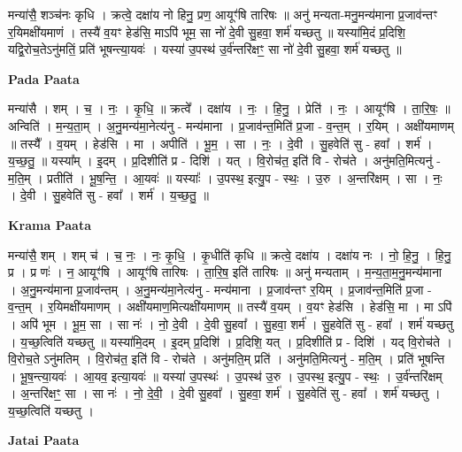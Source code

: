 \documentclass[17pt]{extarticle}
\begin{document}
मन्या॑सै॒ शञ्च॑नः कृधि । क्रत्वे॒ दक्षा॑य नो हिनु॒ प्रण॒ आयूꣳ॑षि तारिषः ॥ अनु॑ मन्यता-मनु॒मन्य॑माना प्र॒जाव॑न्तꣳ र॒यिमक्षी॑यमाणं । तस्यै॑ व॒यꣳ हेड॑सि॒ माऽपि॑ भूम॒ सा नो॑ दे॒वी सु॒हवा॒ शर्म॑ यच्छतु ॥ यस्या॑मि॒दं प्र॒दिशि॒ यद्वि॒रोच॒तेऽनु॑मतिं॒ प्रति॑ भूषन्त्या॒यवः॑ । यस्या॑ उ॒पस्थ॑ उ॒र्व॑न्तरि॑क्षꣳ॒॒ सा नो॑ दे॒वी सु॒हवा॒ शर्म॑ यच्छतु ॥ \newline

\textbf{Pada Paata} \newline

मन्या॑सै । शम् । च॒ । नः॒ । कृ॒धि॒ ॥ क्रत्वे᳚ । दक्षा॑य । नः॒ । हि॒नु॒ । प्रेति॑ । नः॒ । आयूꣳ॑षि । ता॒रि॒षः॒ ॥ अन्विति॑ । म॒न्य॒ता॒म् । अ॒नु॒मन्य॑मा॒नेत्य॑नु - मन्य॑माना । प्र॒जाव॑न्त॒मिति॑ प्र॒जा - व॒न्त॒म् । र॒यिम् । अक्षी॑यमाणम् ॥ तस्यै᳚ । व॒यम् । हेड॑सि । मा । अपीति॑ । भू॒म॒ । सा । नः॒ । दे॒वी । सु॒हवेति॑ सु - हवा᳚ । शर्म॑ । य॒च्छ॒तु॒ ॥ यस्या᳚म् । इ॒दम् । प्र॒दिशीति॑ प्र - दिशि॑ । यत् । वि॒रोच॑त॒ इति॑ वि - रोच॑ते । अनु॑मति॒मित्यनु॑ - म॒ति॒म् । प्रतीति॑ । भू॒ष॒न्ति॒ । आ॒यवः॑ ॥ यस्याः᳚ । उ॒पस्थ॒ इत्यु॒प - स्थः॒ । उ॒रु । अ॒न्तरि॑क्षम् । सा । नः॒ । दे॒वी । सु॒हवेति॑ सु - हवा᳚ । शर्म॑ । य॒च्छ॒तु॒ ॥  \newline


\textbf{Krama Paata} \newline

मन्या॑सै॒ शम् । शम् च॑ । च॒ नः॒ । नः॒ कृ॒धि॒ । कृ॒धीति॑ कृधि ॥ क्रत्वे॒ दक्षा॑य । दक्षा॑य नः । नो॒ हि॒नु॒ । हि॒नु॒ प्र । प्र णः॑ । न॒ आयूꣳ॑षि । आयूꣳ॑षि तारिषः । ता॒रि॒ष॒ इति॑ तारिषः ॥ अनु॑ मन्यताम् । म॒न्य॒ता॒म॒नु॒मन्य॑माना । अ॒नु॒मन्य॑माना प्र॒जाव॑न्तम् । अ॒नु॒मन्य॑मा॒नेत्य॑नु - मन्य॑माना । प्र॒जाव॑न्तꣳ र॒यिम् । प्र॒जाव॑न्त॒मिति॑ प्र॒जा - व॒न्त॒म् । र॒यिमक्षी॑यमाणम् । अक्षी॑यमाण॒मित्यक्षी॑यमाणम् ॥ तस्यै॑ व॒यम् । व॒यꣳ हेड॑सि । हेड॑सि॒ मा । मा ऽपि॑ । अपि॑ भूम । भू॒म॒ सा । सा नः॑ । नो॒ दे॒वी । दे॒वी सु॒हवा᳚ । सु॒हवा॒ शर्म॑ । सु॒हवेति॑ सु - हवा᳚ । शर्म॑ यच्छतु । य॒च्छ॒त्विति॑ यच्छतु ॥ यस्या॑मि॒दम् । इ॒दम् प्र॒दिशि॑ । प्र॒दिशि॒ यत् । प्र॒दिशीति॑ प्र - दिशि॑ । यद् वि॒रोच॑ते । वि॒रोच॒ते ऽनु॑मतिम् । वि॒रोच॑त॒ इति॑ वि - रोच॑ते । अनु॑मति॒म् प्रति॑ । अनु॑मति॒मित्यनु॑ - म॒ति॒म् । प्रति॑ भूषन्ति । भू॒ष॒न्त्या॒यवः॑ । आ॒यव॒ इत्या॒यवः॑ ॥ यस्या॑ उ॒पस्थः॑ । उ॒पस्थ॑ उ॒रु । उ॒पस्थ॒ इत्यु॒प - स्थः॒ । उ॒र्व॑न्तरि॑क्षम् । अ॒न्तरि॑क्षꣳ॒॒ सा । सा नः॑ । नो॒ दे॒वी॒ । दे॒वी सु॒हवा᳚ । सु॒हवा॒ शर्म॑ । सु॒हवेति॑ सु - हवा᳚ । शर्म॑ यच्छतु । य॒च्छ॒त्विति॑ यच्छतु । \newline

\textbf{Jatai Paata} \newline
\end{document}
